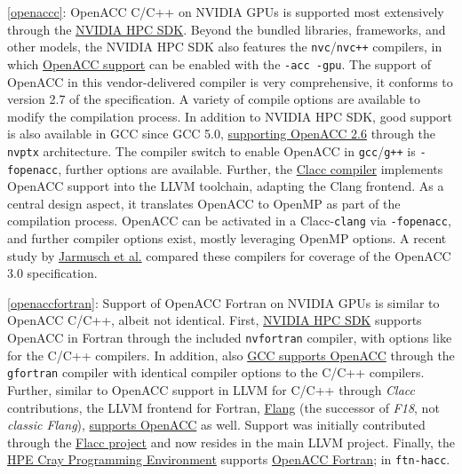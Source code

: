 \item \ref{openaccc}: OpenACC C/C++ on NVIDIA GPUs is supported most extensively through the \href{https://developer.nvidia.com/hpc-sdk}{NVIDIA HPC SDK}. Beyond the bundled libraries, frameworks, and other models, the NVIDIA HPC SDK also features the \texttt{nvc}/\texttt{nvc++} compilers, in which \href{https://docs.nvidia.com/hpc-sdk/compilers/hpc-compilers-user-guide/index.html\#acc-use}{OpenACC support} can be enabled with the \texttt{-acc\ -gpu}. The support of OpenACC in this vendor-delivered compiler is very comprehensive, it conforms to version 2.7 of the specification. A variety of compile options are available to modify the compilation process. In addition to NVIDIA HPC SDK, good support is also available in GCC since GCC 5.0, \href{https://gcc.gnu.org/wiki/OpenACC}{supporting OpenACC 2.6} through the \texttt{nvptx} architecture. The compiler switch to enable OpenACC in \texttt{gcc}/\texttt{g++} is \texttt{-fopenacc}, further options are available. Further, the \href{https://csmd.ornl.gov/project/clacc}{Clacc compiler} implements OpenACC support into the LLVM toolchain, adapting the Clang frontend. As a central design aspect, it translates OpenACC to OpenMP as part of the compilation process. OpenACC can be activated in a Clacc-\texttt{clang} via \texttt{-fopenacc}, and further compiler options exist, mostly leveraging OpenMP options. A recent study by \href{https://ieeexplore.ieee.org/document/10029456}{Jarmusch et al.} compared these compilers for coverage of the OpenACC 3.0 specification.
\item \ref{openaccfortran}: Support of OpenACC Fortran on NVIDIA GPUs is similar to OpenACC C/C++, albeit not identical. First, \href{https://developer.nvidia.com/hpc-sdk}{NVIDIA HPC SDK} supports OpenACC in Fortran through the included \texttt{nvfortran} compiler, with options like for the C/C++ compilers. In addition, also \href{https://gcc.gnu.org/wiki/OpenACC}{GCC supports OpenACC} through the \texttt{gfortran} compiler with identical compiler options to the C/C++ compilers. Further, similar to OpenACC support in LLVM for C/C++ through \emph{Clacc} contributions, the LLVM frontend for Fortran, \href{https://flang.llvm.org/docs/}{Flang} (the successor of \emph{F18}, not \emph{classic Flang}), \href{https://flang.llvm.org/docs/OpenACC.html}{supports OpenACC} as well. Support was initially contributed through the \href{https://ieeexplore.ieee.org/document/9651310}{Flacc project} and now resides in the main LLVM project. Finally, the \href{https://www.hpe.com/psnow/doc/a50002303enw}{HPE Cray Programming Environment} supports \href{https://cpe.ext.hpe.com/docs/cce/man7/intro_openacc.7.html}{OpenACC Fortran}; in \texttt{ftn-hacc}.
